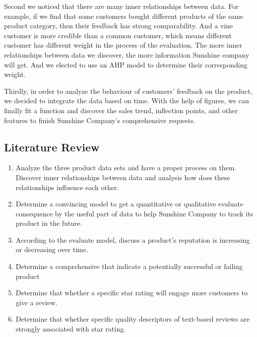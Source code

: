 \documentclass{mcmthesis}
\begin{document}
Second we noticed that there are many inner relationships between data. For example, if we find that some customers bought different products of the same product category, then their feedback has strong comparability. And a vine customer is more credible than a common customer, which means different customer has different weight in the process of the evaluation. The more inner relationships between data we discover, the more information Sunshine company will get. And we elected to use an AHP model to determine their corresponding weight.

Thirdly, in order to analyze the behaviour of customers' feedback on the product, we decided to integrate the data based on time. With the help of figures, we can finally fit a function and discover the sales trend, inflection points, and other features to finish Sunshine Company's comprehensive requests.

\subsection{Literature Review}
\begin{enumerate}
    \item Analyze the three product data sets and have a proper process on them. Discover inner relationships between data and analysis how does these relationships influence each other.
    
    \item Determine a convincing model to get a quantitative or qualitative evaluate consequence by the useful part of data to help Sunshine Company to track its product in the future.
    
    \item According to the evaluate model, discuss a product's reputation is increasing or decreasing over time.
    
    \item Determine a comprehensive that indicate a potentially successful or failing product
    
    \item Determine that whether a specific star rating will engage more customers to give a review.
    
    \item Determine that whether specific quality descriptors of text-based reviews are strongly associated with star rating.
    
    
\end{enumerate}
\end{document}
